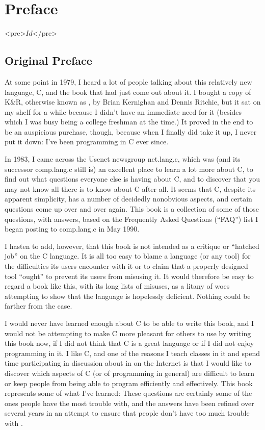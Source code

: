 \chapter*{Preface}

\begin{rawhtml}
<pre>$Id$</pre>
\end{rawhtml}

\section*{Original Preface}

\initfaq

At some point in 1979, I heard a lot of people talking about this relatively
new language, C, and the book that had just come out about it. I bought a
copy of K\&R, otherwise known as , by Brian
Kernighan and Dennis Ritchie, but it sat on my shelf for a while because I
didn't have an immediate need for it (besides which I was busy being a college
freshman at the time.)  It proved in the end to be an auspicious purchase,
though, because when I finally did take it up, I never put it down: I've been
programming in C ever since.

In 1983, I came across the Usenet newsgroup net.lang.c, which was (and
its successor comp.lang.c still is) an excellent place to learn a lot more about
C, to find out what questions everyone else is having about C, and to discover
that you may not know all there is to know about C after all.  It seems that
C, despite its apparent simplicity, has a number of decidedly nonobvious 
aspects, and certain questions come up over and over again.  This book is a
collection of some of those questions, with answers, based on the Frequently
Asked Questions (``FAQ'') list I began posting to comp.lang.c in May 1990.

I hasten to add, however, that this book is not intended as a critique or
``hatched job'' on the C language.  It is all too easy to blame a language
(or any tool) for the difficulties its users encounter with it or to claim
that a properly designed tool ``ought'' to prevent its users from misusing it.
It would therefore be easy to regard a book like this, with its long lists of
misuses, as a litany of woes attempting to show that the language is hopelessly
deficient. Nothing could be farther from the case.

I would never have learned enough about C to be able to write this book,
and I would not be attempting to make C more pleasant for others to use by
writing this book now, if I did not think that C is a great language or if I
did not enjoy programming in it. I  like C, and one of the reasons I
teach classes in it and spend time participating in discussion about in on the
Internet is that I would like to discover which aspects of C (or of programming
in general) are difficult to learn or keep people from being able to program
efficiently and effectively.  This book represents some of what I've learned:
These questions are certainly some of the ones people have the most trouble
with, and the answers have been refined over several years in an attempt to
ensure that people don't have too much trouble with .


